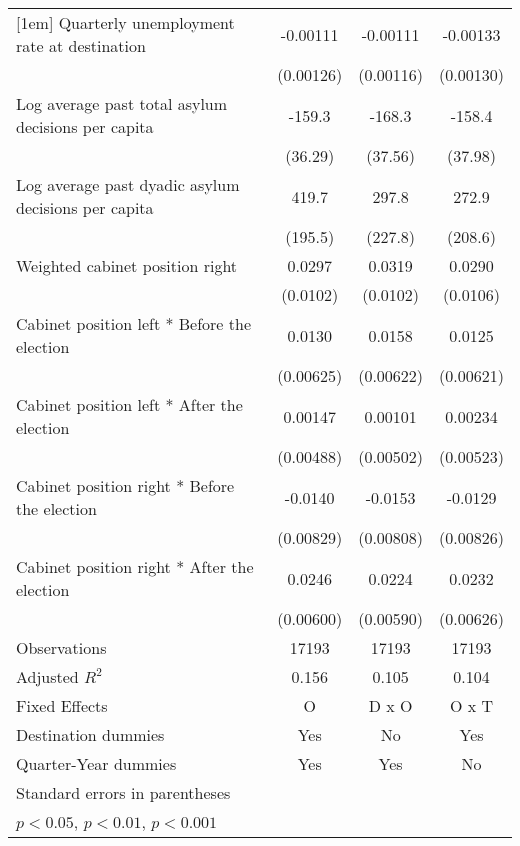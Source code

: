 \begin{table}[htbp]
\begin{tabular}{l*{3}{c}}
[1em]
Quarterly unemployment rate at destination&    -0.00111         &    -0.00111         &    -0.00133         \\
                    &   (0.00126)         &   (0.00116)         &   (0.00130)         \\
[1em]
Log average past total asylum decisions per capita&      -159.3\sym{***}&      -168.3\sym{***}&      -158.4\sym{***}\\
                    &     (36.29)         &     (37.56)         &     (37.98)         \\
[1em]
Log average past dyadic asylum decisions per capita&       419.7\sym{*}  &       297.8         &       272.9         \\
                    &     (195.5)         &     (227.8)         &     (208.6)         \\
[1em]
Weighted cabinet position right&      0.0297\sym{**} &      0.0319\sym{**} &      0.0290\sym{**} \\
                    &    (0.0102)         &    (0.0102)         &    (0.0106)         \\
[1em]
Cabinet position left * Before the election&      0.0130\sym{*}  &      0.0158\sym{*}  &      0.0125         \\
                    &   (0.00625)         &   (0.00622)         &   (0.00621)         \\
[1em]
Cabinet position left * After the election&     0.00147         &     0.00101         &     0.00234         \\
                    &   (0.00488)         &   (0.00502)         &   (0.00523)         \\
[1em]
Cabinet position right * Before the election&     -0.0140         &     -0.0153         &     -0.0129         \\
                    &   (0.00829)         &   (0.00808)         &   (0.00826)         \\
[1em]
Cabinet position right * After the election&      0.0246\sym{***}&      0.0224\sym{***}&      0.0232\sym{***}\\
                    &   (0.00600)         &   (0.00590)         &   (0.00626)         \\
\hline
Observations        &       17193         &       17193         &       17193         \\
Adjusted \(R^{2}\)  &       0.156         &       0.105         &       0.104         \\
Fixed Effects       &           O         &       D x O         &       O x T         \\
Destination dummies &         Yes         &          No         &         Yes         \\
Quarter-Year dummies&         Yes         &         Yes         &          No         \\
\hline\hline
\multicolumn{4}{l}{\footnotesize Standard errors in parentheses}\\
\multicolumn{4}{l}{\footnotesize \sym{*} \(p<0.05\), \sym{**} \(p<0.01\), \sym{***} \(p<0.001\)}\\
\end{tabular}
\end{table}
